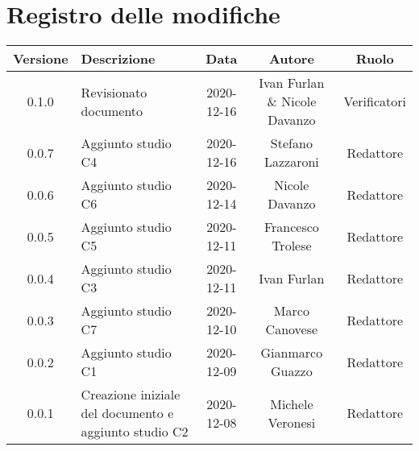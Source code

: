 \section*{Registro delle modifiche}

\begin{center}
	\begin{longtable}{|c|p{5cm}|c|c|c|}
	\hline
	\rowcolor{lighter-grayer}
	\textbf{Versione} & \textbf{Descrizione} & \textbf{Data} & \textbf{Autore} & \textbf{Ruolo} \\
	\hline
	\endfirsthead


	\hline
	0.1.0 & Revisionato documento & 2020-12-16 & Ivan Furlan \& Nicole Davanzo & Verificatori \\
	0.0.7 & Aggiunto studio C4 & 2020-12-16 & Stefano Lazzaroni & Redattore \\
	0.0.6 & Aggiunto studio C6 & 2020-12-14 & Nicole Davanzo & Redattore \\
	0.0.5 & Aggiunto studio C5 & 2020-12-11 & Francesco Trolese & Redattore \\
	0.0.4 & Aggiunto studio C3 & 2020-12-11 & Ivan Furlan & Redattore \\
	0.0.3 & Aggiunto studio C7 & 2020-12-10 & Marco Canovese & Redattore \\
	0.0.2 & Aggiunto studio C1 & 2020-12-09 & Gianmarco Guazzo & Redattore\\
    0.0.1 & Creazione iniziale del documento e aggiunto studio C2 & 2020-12-08 & Michele Veronesi & Redattore\\
	\hline

	\end{longtable}
\end{center}